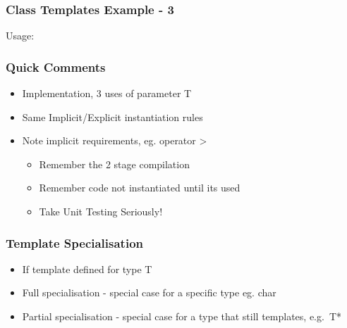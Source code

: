 \subsubsection{Class Templates Example -
3}\label{class-templates-example---3}

Usage:

\begin{Shaded}
\begin{Highlighting}[]

  
\NormalTok{\{}
  \NormalTok{,}\NormalTok{);}
   
\NormalTok{\}}
\end{Highlighting}
\end{Shaded}

\subsubsection{Quick Comments}\label{quick-comments}

\begin{itemize}
\itemsep1pt\parskip0pt
\item
  Implementation, 3 uses of parameter T
\item
  Same Implicit/Explicit instantiation rules
\item
  Note implicit requirements, eg. operator \textgreater{}

  \begin{itemize}
  \itemsep1pt\parskip0pt
  \item
    Remember the 2 stage compilation
  \item
    Remember code not instantiated until its used
  \item
    Take Unit Testing Seriously!
  \end{itemize}
\end{itemize}

\subsubsection{Template Specialisation}\label{template-specialisation}

\begin{itemize}
\itemsep1pt\parskip0pt
\item
  If template defined for type T
\item
  Full specialisation - special case for a specific type eg. char
\item
  Partial specialisation - special case for a type that still templates,
  e.g.~T*
\end{itemize}

